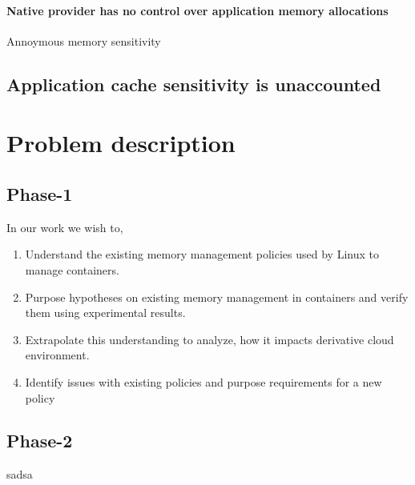 	 \paragraph{Native provider has no control over application memory allocations}
	    Annoymous memory sensitivity
      \subsection{Application cache sensitivity is unaccounted}
    
  \section{Problem description}
  
   \subsection{Phase-1}
   In our work we wish to,
    
    \begin{enumerate}
      \item Understand the existing memory management policies used by Linux to manage containers.
      \item Purpose hypotheses on existing memory management in containers and verify them using experimental results.
      \item Extrapolate this understanding to analyze, how it impacts derivative cloud environment.
      \item Identify issues with existing policies and purpose requirements for a new policy
    \end{enumerate}

   \subsection{Phase-2}
   
   sadsa
  
  